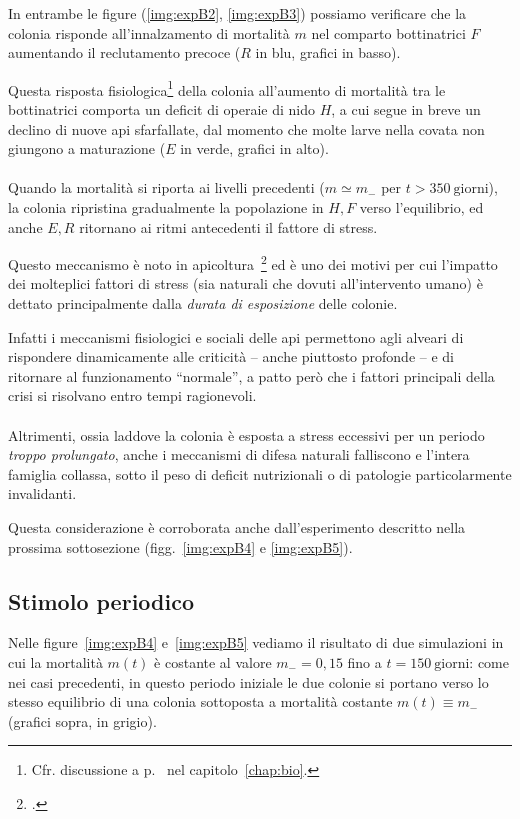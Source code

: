In entrambe le figure (\ref{img:expB2}, \ref{img:expB3}) possiamo verificare che la colonia risponde all'innalzamento
di mortalità $m$ nel comparto bottinatrici $F$ aumentando il reclutamento precoce ($R$ in blu, grafici in basso).

Questa risposta fisiologica\footnote{Cfr. discussione a p.~\pageref{par:socialRecr} nel capitolo~\ref{chap:bio}.}
della colonia
all'aumento di mortalità tra le bottinatrici comporta un deficit di operaie di nido $H$, a cui segue in
breve un declino di nuove api sfarfallate, dal momento che molte larve nella covata non giungono a maturazione
($E$ in verde, grafici in alto).

\paragraph{}
Quando la mortalità si riporta ai livelli precedenti ($m \simeq m_-$ per $t>350~\text{giorni}$), la colonia
ripristina gradualmente la popolazione in $H,F$ verso l'equilibrio, ed anche $E,R$ ritornano ai ritmi
antecedenti il fattore di stress.

Questo meccanismo è noto in apicoltura~\footcite{privFDL,privFPan,meccanica} ed è uno dei motivi per cui
l'impatto dei molteplici fattori di stress (sia naturali che dovuti all'intervento umano) è dettato principalmente
dalla \emph{durata di esposizione} delle colonie.

Infatti i meccanismi fisiologici e sociali delle api permettono agli alveari di rispondere dinamicamente alle criticità
-- anche piuttosto profonde -- e di ritornare al funzionamento ``normale'', a patto però che i fattori principali
della crisi si risolvano entro tempi ragionevoli.

\paragraph{}
Altrimenti, ossia laddove la colonia è esposta a stress eccessivi per un periodo \emph{troppo prolungato},
anche i meccanismi di difesa naturali falliscono e l'intera famiglia collassa, sotto il peso di
deficit nutrizionali o di patologie particolarmente invalidanti.

Questa considerazione è corroborata anche dall'esperimento descritto nella prossima sottosezione
(figg.~\ref{img:expB4} e \ref{img:expB5}).


\subsection{Stimolo periodico}
Nelle figure~\ref{img:expB4} e~\ref{img:expB5} vediamo il risultato di due simulazioni in cui la
mortalità $m(t)$ è costante al valore $m_-=0,15$ fino a $t=150~\text{giorni}$: come nei casi precedenti,
in questo periodo iniziale le due colonie si portano verso lo stesso equilibrio di una colonia
sottoposta a mortalità costante $m(t) \equiv m_-$ (grafici sopra, in grigio).

